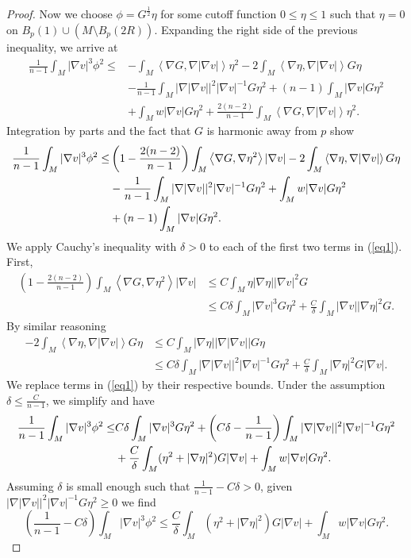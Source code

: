\documentclass[10pt,a4paper]{amsart}
\begin{document}
\begin{proof}
Now we choose $\phi = G^{\frac{1}{2}}\eta$ for some cutoff function $0\leq \eta\leq 1$ such that $\eta = 0$ on $B_p(1)\cup (M\setminus B_p(2R))$. Expanding the right side of the previous inequality, we arrive at
\begin{align*}
\frac{1}{n-1}\int_M |\nabla v|^3\phi^2\leq &- \int_M \left<\nabla G, \nabla|\nabla v|\right>\eta^2-2\int_M \left<\nabla \eta, \nabla |\nabla v|\right>G\eta \\
&-\frac{1}{n-1}\int_M |\nabla |\nabla v||^2|\nabla v|^{-1}G\eta^2 + (n-1)\int_M|\nabla v|G\eta^2\\
&+\int_M w|\nabla v| G\eta^2  +\frac{2(n-2)}{n-1}\int_M \left<\nabla G, \nabla|\nabla v|\right> \eta^2.
\end{align*}
Integration by parts and the fact that $G$ is harmonic away from $p$ show
\begin{align}\label{eq1}
\frac{1}{n-1}\int_M |\nabla v|^3\phi^2 \leq &\left(1-\frac{2(n-2)}{n-1}\right)\int_M \left<\nabla G,\nabla\eta^2\right>|\nabla v|-2\int_M\left<\nabla\eta,\nabla |\nabla v|\right>G\eta \notag \\
&-\frac{1}{n-1}\int_M|\nabla |\nabla v||^2|\nabla v|^{-1}G\eta^2+\int_M w|\nabla v| G\eta^2\notag\\
&+ (n-1)\int_M|\nabla v|G\eta^2.  
\end{align}
We apply Cauchy's inequality with $\delta>0$ to each of the first two terms in (\ref{eq1}). First,
\begin{align*}
\left(1-\frac{2(n-2)}{n-1}\right)\int_M \left<\nabla G,\nabla\eta^2\right>|\nabla v|&\leq C\int_M \eta |\nabla \eta||\nabla v|^2 G\\
&\leq C\delta \int_M |\nabla v|^3G\eta^2 + \frac{C}{\delta}\int_M |\nabla v||\nabla \eta|^2 G.
\end{align*}
By similar reasoning
\begin{align*}
-2\int_M\left<\nabla\eta,\nabla |\nabla v|\right>G\eta &\leq C\int_M |\nabla\eta||\nabla|\nabla v|| G\eta \\
&\leq C\delta \int_M |\nabla|\nabla v||^2|\nabla v|^{-1}G\eta^2 +\frac{C}{\delta}\int_M|\nabla\eta|^2G|\nabla v|.
\end{align*}
We replace terms in (\ref{eq1}) by their respective bounds. Under the assumption $\delta\leq \frac{C}{n-1}$, we simplify and have
\begin{align}
\frac{1}{n-1}\int_M|\nabla v|^3\phi^2 \leq& C\delta\int_M |\nabla v|^3G\eta^2 + \left(C\delta - \frac{1}{n-1}\right)\int_M|\nabla |\nabla v||^2|\nabla v|^{-1}G\eta^2 \notag \\
&+ \frac{C}{\delta}\int_M (\eta^2+|\nabla\eta|^2)G|\nabla v|+\int_Mw|\nabla v|G\eta^2.\notag
\end{align}
Assuming $\delta$ is small enough such that $\frac{1}{n-1} - C\delta > 0$, given $|\nabla|\nabla v||^2|\nabla v|^{-1} G\eta^2 \geq 0$ we find
\begin{equation}\label{eq2}\left(\frac{1}{n-1}-C\delta\right)\int_M |\nabla v|^3\phi^2 \leq \frac{C}{\delta}\int_M(\eta^2+|\nabla\eta|^2)G|\nabla v|+\int_M w|\nabla v|G\eta^2.\end{equation}


\end{proof}
\end{document}
